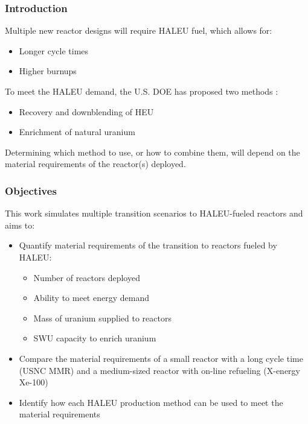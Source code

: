 \begin{frame}
    \frametitle{Introduction}
    Multiple new reactor designs will require \gls{HALEU} fuel, which allows for: 
    \begin{itemize}
        \item Longer cycle times
        \item Higher burnups 
    \end{itemize}
    To meet the \gls{HALEU} demand, the U.S. \gls{DOE} has proposed two methods
    \cite{griffith_overview_2020}:
    \begin{itemize}
        \item Recovery and downblending of \gls{HEU}
        \item Enrichment of natural uranium
    \end{itemize}
    Determining which method to use, or how to combine them, will depend on 
    the material requirements of the reactor(s) deployed.

\end{frame}

\begin{frame}
    \frametitle{Objectives}
    This work simulates multiple transition scenarios to \gls{HALEU}-fueled 
    reactors and aims to:
    \begin{itemize}
        \item Quantify material requirements of the transition to reactors 
              fueled by \gls{HALEU}:
              \begin{itemize}
                  \item Number of reactors deployed 
                  \item Ability to meet energy demand
                  \item Mass of uranium supplied to reactors
                  \item \gls{SWU} capacity to enrich uranium
              \end{itemize}
        \item Compare the material requirements of a small reactor with a long cycle 
              time (\gls{USNC} \gls{MMR}) and a medium-sized reactor with on-line 
              refueling (X-energy Xe-100)
        \item Identify how each \gls{HALEU} production method can be used to 
              meet the material requirements
    \end{itemize}
\end{frame}